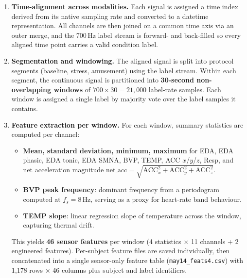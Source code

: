 \documentclass[11pt]{article}
\begin{document}
\begin{enumerate}
    \item \textbf{Time-alignment across modalities.}
    Each signal is assigned a time index derived from its native sampling rate and converted to a datetime representation.
    All channels are then joined on a common time axis via an outer merge, and the 700\,Hz label stream is forward- and back-filled so every aligned time point carries a valid condition label.

    \item \textbf{Segmentation and windowing.}
    The aligned signal is split into protocol segments (baseline, stress, amusement) using the label stream.
    Within each segment, the continuous signal is partitioned into \textbf{30-second non-overlapping windows} of $700 \times 30 = 21{,}000$ label-rate samples.
    Each window is assigned a single label by majority vote over the label samples it contains.

    \item \textbf{Feature extraction per window.}
    For each window, summary statistics are computed per channel:
    \begin{itemize}
        \item \textbf{Mean, standard deviation, minimum, maximum} for EDA, EDA phasic, EDA tonic, EDA SMNA, BVP, TEMP, ACC $x$/$y$/$z$, Resp, and net acceleration magnitude $\text{net\_acc} = \sqrt{\text{ACC}_x^2 + \text{ACC}_y^2 + \text{ACC}_z^2}$.
        \item \textbf{BVP peak frequency}: dominant frequency from a periodogram computed at $f_s = 8$\,Hz, serving as a proxy for heart-rate band behaviour.
        \item \textbf{TEMP slope}: linear regression slope of temperature across the window, capturing thermal drift.
    \end{itemize}
    This yields \textbf{46 sensor features} per window (4 statistics $\times$ 11 channels + 2 engineered features).
    Per-subject feature files are saved individually, then concatenated into a single sensor-only feature table (\texttt{may14\_feats4.csv}) with 1{,}178 rows $\times$ 46 columns plus subject and label identifiers.
\end{enumerate}
\end{document}
